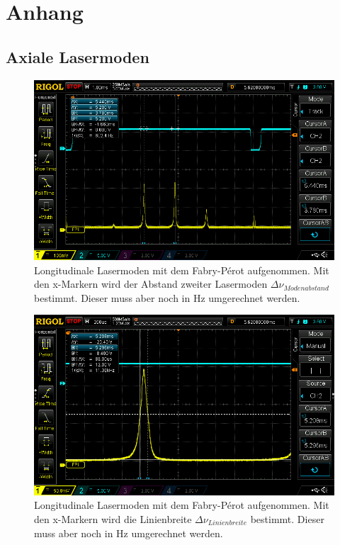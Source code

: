 

\chapter{Anhang}
\label{chap:anhangA}


\section{Axiale Lasermoden}

\begin{figure}[ht]
    \centering
    \includegraphics[width = \linewidth]{Bilder/Auswertung/FabryPerotModenAbstand.png}
    \caption{Longitudinale Lasermoden mit dem Fabry-Pérot aufgenommen. Mit den x-Markern wird der Abstand zweiter Lasermoden $\Delta \nu_{Modenabstand}$ bestimmt. Dieser muss aber noch in Hz umgerechnet werden.}
    \label{bild:AxialModenAbstand}
\end{figure}

\begin{figure}[ht]
    \centering
    \includegraphics[width = \linewidth]{Bilder/Auswertung/FabryPerotLinienbreite.png}
    \caption{Longitudinale Lasermoden mit dem Fabry-Pérot aufgenommen. Mit den x-Markern wird die Linienbreite $\Delta \nu_{Linienbreite}$ bestimmt. Dieser muss aber noch in Hz umgerechnet werden.}
    \label{bild:Lininebreite}
\end{figure}


